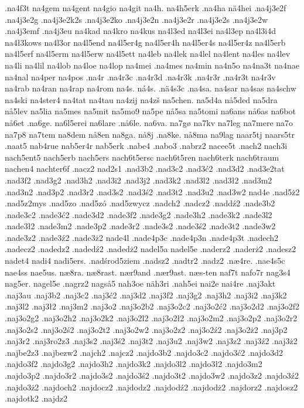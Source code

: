 {{.na4f3t
na4gem
na4gent
na4gio
na4git
na4h.
na4h5erk
.na4ha
nä4hei
.na4j3e2f
.na4j3e2g
.na4j3e2k2s
.na4j3e2ko
.na4j3e2n
.na4j3e2r
.na4j3e2s
.na4j3e2w
.na4j3emf
.na4j3eu
na4kad
na4kro
na4kus
na4l3ed
na4l3ei
na4l3ep
na4l3i4d
na4ł3kows
na4l3or
na4l5end
na4l5er4g
na4l5er4h
na4l5er4s
na4l5er4z
na4l5erb
na4l5erf
na4l5erm
na4l5erw
na4l5ett
na4leb
na4lek
na4lel
na4lent
na4les
na4lev
na4li
na4lil
na4lob
na4loe
na4lop
na4mei
.na4mes
na4min
na4n5o
na4na3t
na4nae
na4nal
na4per
na4pos
.na4r
.na4r3c
.na4r3d
.na4r3k
.na4r3r
.na4r3t
na4r3v
na4rab
na4ran
na4rap
na4rom
na4s.
ná4s.
.nä4s3c
.na4sa.
na4sar
na4sas
na4schw
na4ski
na4ster4
na4tat
na4tau
na4zij
na4zš
na5chen.
na5d4a
nå5ded
na5dra
nå5lev
na5lia
na5mes
na5mit
na5mo9
na5pe
nå5sa
na5tomi
na6ans
nå6as
na6bot
nå6et
.na6ge.
na6l5erei
na6lare
.nå6le.
na6va.
na7gø
na7kv
na7leg
na7mere
na7o
na7p8
na7tem
na8dem
nå8en
na8ga.
nå8j
.na8ke.
nå8ma
na9lag
naar5tj
naars5tr
.naat5
nab4rue
nab5er4r
nab5erk
.nabe4
.nabo3
.nabrz2
nacee5t
.nach2
nach3i
nach5ent5
nach5erb
nach5ers
nach6t5ersc
nach6t5ren
nach6terk
nach6traum
nachen4
nachter6f
.nacz2
nad2s1
.nad3b2
.nad3c2
.nad3ć2
.nad3d2
.nad3e2tat
.nad3f2
.nad3g2
.nad3h2
.nad3i2
.nad3j2
.nad3k2
.nad3l2
.nad3ł2
.nad3m2
.nad3n2
.nad3p2
.nad3r2
.nad3s2
.nad3ś2
.nad3t2
.nad3u2
.nad3w2
nad4e
.nad5ż2
.nad5z2mys
.nad5zo
.nad5zó
.nad5zwycz
.nadch2
.nadcz2
.naddź2
.nade3b2
.nade3c2
.nade3ć2
.nade3d2
.nade3f2
.nade3g2
.nade3h2
.nade3k2
.nade3l2
.nade3ł2
.nade3m2
.nade3p2
.nade3r2
.nade3s2
.nade3ś2
.nade3t2
.nade3w2
.nade3z2
.nade3ź2
.nade3ż2
nade4l
.nade4p3c
.nade4p3n
.nade4p3t
.nadech2
.nadecz2
.nadedz2
.nadedź2
.nadedż2
nadel5a
nadel5e
.naderz2
.naderż2
.nadesz2
nadet4
nadi4
nadi5ers.
.nadśrod5ziem
.nadsz2
.nadtr2
.nadz2
.næ4re.
.nae4s5c
nae4ss
nae5us.
næ8ra.
næ8rast.
nær9and
.nær9ast.
næs-ten
naf7t
nafo7r
nag3s4
nag5er.
nagel5e
.nagrz2
nagså5
nah3oe
näh3ri
.nah5ei
nai2e
nai4re
.naj3akt
.naj3au
.naj3b2
.naj3c2
.naj3ć2
.naj3d2
.naj3f2
.naj3g2
.naj3h2
.naj3i2
.naj3k2
.naj3l2
.naj3ł2
.naj3m2
.naj3o2
.naj3o2b2
.naj3o2c2
.naj3o2ć2
.naj3o2d2
.naj3o2f2
.naj3o2g2
.naj3o2h2
.naj3o2k2
.naj3o2l2
.naj3o2ł2
.naj3o2m2
.naj3o2p2
.naj3o2r2
.naj3o2s2
.naj3o2ś2
.naj3o2t2
.naj3o2w2
.naj3o2z2
.naj3o2ź2
.naj3o2ż2
.naj3p2
.naj3r2
.naj3ro2z3
.naj3s2
.naj3ś2
.naj3t2
.naj3u2
.naj3w2
.naj3z2
.naj3ź2
.naj3ż2
.najbe2z3
.najbezw2
.najch2
.najcz2
.najdo3b2
.najdo3c2
.najdo3ć2
.najdo3d2
.najdo3f2
.najdo3g2
.najdo3h2
.najdo3k2
.najdo3l2
.najdo3ł2
.najdo3m2
.najdo3p2
.najdo3r2
.najdo3s2
.najdo3ś2
.najdo3t2
.najdo3w2
.najdo3z2
.najdo3ź2
.najdo3ż2
.najdoch2
.najdocz2
.najdodz2
.najdodź2
.najdodż2
.najdorz2
.najdosz2
.najdotk2
.najdz2
}}
